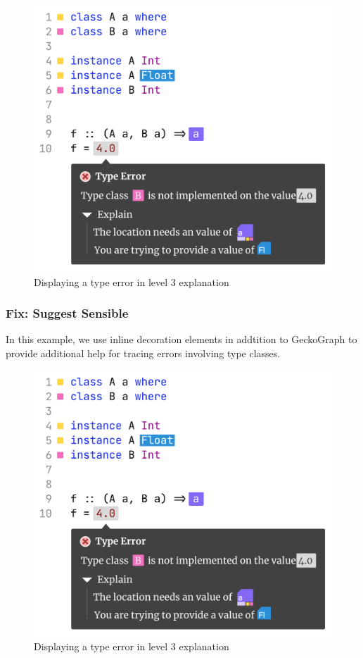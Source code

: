   \begin{figure}[hbt]
    \includegraphics[width=\linewidth]{TypeClass}
    \caption{
        Displaying a type error in level 3 explanation
      }
  \end{figure}


  \subsubsection{Fix: Suggest Sensible}

  In this example, we use inline decoration elements in addtition to GeckoGraph to provide additional help for tracing errors involving type classes.  

  \begin{figure}[hbt]
    \includegraphics[width=\linewidth]{TypeClass}
    \caption{
        Displaying a type error in level 3 explanation
      }
  \end{figure}

